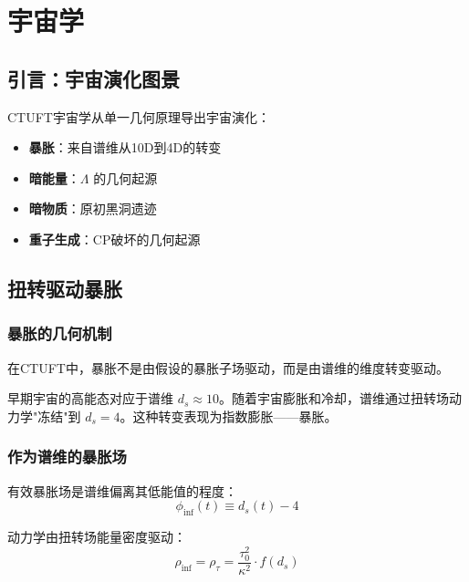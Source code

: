 \section{宇宙学}
\label{sec:cosmology}

\subsection{引言：宇宙演化图景}

CTUFT宇宙学从单一几何原理导出宇宙演化：
\begin{itemize}
    \item \textbf{暴胀}：来自谱维从10D到4D的转变
    \item \textbf{暗能量}：$\Lambda$ 的几何起源
    \item \textbf{暗物质}：原初黑洞遗迹
    \item \textbf{重子生成}：CP破坏的几何起源
\end{itemize}

\subsection{扭转驱动暴胀}

\subsubsection{暴胀的几何机制}

在CTUFT中，暴胀不是由假设的暴胀子场驱动，而是由谱维的维度转变驱动。

\begin{insight}[作为维度转变的暴胀]
早期宇宙的高能态对应于谱维 $d_s \approx 10$。随着宇宙膨胀和冷却，谱维通过扭转场动力学"冻结"到 $d_s = 4$。这种转变表现为指数膨胀——暴胀。
\end{insight}

\subsubsection{作为谱维的暴胀场}

有效暴胀场是谱维偏离其低能值的程度：
\begin{equation}
    \phi_{\text{inf}}(t) \equiv d_s(t) - 4
\end{equation}

动力学由扭转场能量密度驱动：
\begin{equation}
    \rho_{\text{inf}} = \rho_\tau = \frac{\tau_0^2}{\kappa^2} \cdot f(d_s)
\end{equation}

